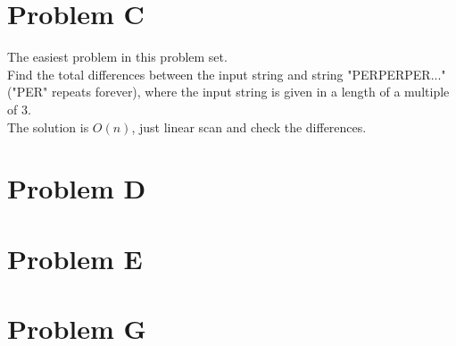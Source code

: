 \documentclass[10pt]{article}
\begin{document}


\newpage



\section*{Problem C}

The easiest problem in this problem set.\\

Find the total differences between the input string and string "PERPERPER..." ("PER" repeats forever), where the input string is given in a length of a multiple of 3.\\

The solution is $O(n)$, just linear scan and check the differences.\\



\newpage



\section*{Problem D}





\newpage



\section*{Problem E}



\newpage



\section*{Problem G}



\newpage
\end{document}
